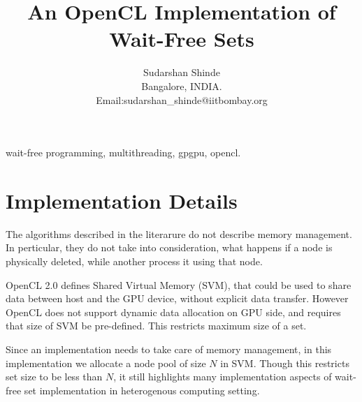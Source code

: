 \documentclass[11pt,onecolumn,draftcls]{IEEEtran}
\begin{document}
\title{An OpenCL Implementation of Wait-Free Sets}

\author{Sudarshan Shinde \\
        Bangalore, INDIA. \\
Email:sudarshan\_shinde@iitbombay.org}

\maketitle




\begin{abstract}

\end{abstract}

\begin{IEEEkeywords}
wait-free programming, multithreading, gpgpu, opencl.
\end{IEEEkeywords}


\pagebreak

\section{Implementation Details}

The algorithms described in the literarure do not describe memory management. In perticular, they do not take into consideration, what happens if a node is physically deleted, while another process it using that node.

OpenCL 2.0 defines Shared Virtual Memory (SVM), that could be used to share data between host and the GPU device, without explicit data transfer. However OpenCL does not support dynamic data allocation on GPU side, and requires that size of SVM be pre-defined. This restricts maximum size of a set.

Since an implementation needs to take care of memory management, in this implementation we allocate a node pool of size $N$ in SVM. Though this restricts set size to be less than $N$, it still highlights many implementation aspects of wait-free set implementation in heterogenous computing setting.  
\end{document}

